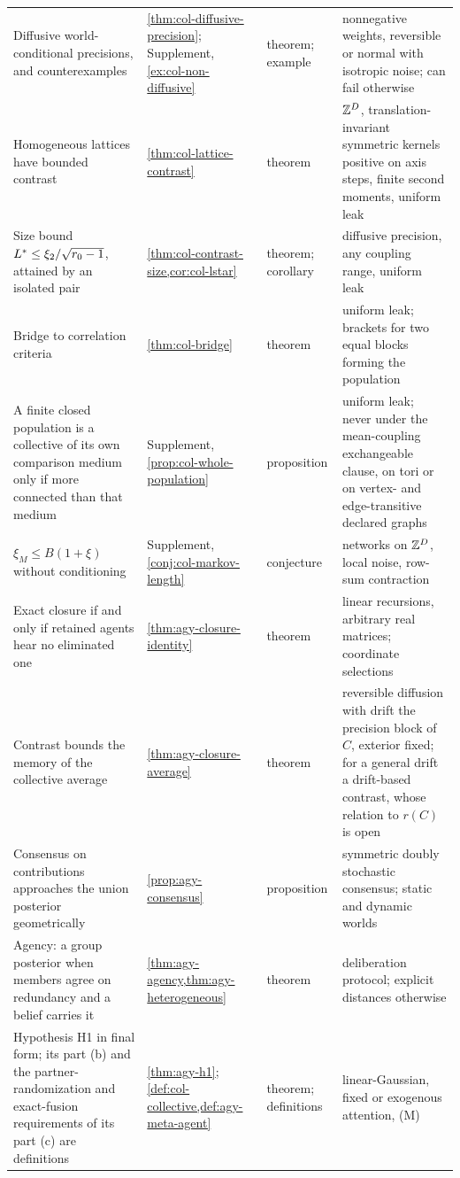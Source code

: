 \begin{longtable}{@{}>{\raggedright\arraybackslash}p{}>{\raggedright\arraybackslash}p{}>{\raggedright\arraybackslash}p{}>{\raggedright\arraybackslash}p{}@{}}
Diffusive world-conditional precisions, and counterexamples & \cref{thm:col-diffusive-precision}; Supplement, \cref{ex:col-non-diffusive} & theorem; example & nonnegative weights, reversible or normal with isotropic noise; can fail otherwise\\
Homogeneous lattices have bounded contrast & \cref{thm:col-lattice-contrast} & theorem & $\mathbb{Z}^D$, translation-invariant symmetric kernels positive on axis steps, finite second moments, uniform leak\\
Size bound $L^{\ast}\le\xi_2/\sqrt{r_0-1}$, attained by an isolated pair & \cref{thm:col-contrast-size,cor:col-lstar} & theorem; corollary & diffusive precision, any coupling range, uniform leak\\
Bridge to correlation criteria & \cref{thm:col-bridge} & theorem & uniform leak; brackets for two equal blocks forming the population\\
A finite closed population is a collective of its own comparison medium only if more connected than that medium & Supplement, \cref{prop:col-whole-population} & proposition & uniform leak; never under the mean-coupling exchangeable clause, on tori or on vertex- and edge-transitive declared graphs\\
$\xi_M\le B(1+\xi)$ without conditioning & Supplement, \cref{conj:col-markov-length} & conjecture & networks on $\mathbb{Z}^D$, local noise, row-sum contraction\\
\addlinespace[2pt]
Exact closure if and only if retained agents hear no eliminated one & \cref{thm:agy-closure-identity} & theorem & linear recursions, arbitrary real matrices; coordinate selections\\
Contrast bounds the memory of the collective average & \cref{thm:agy-closure-average} & theorem & reversible diffusion with drift the precision block of $C$, exterior fixed; for a general drift a drift-based contrast, whose relation to $r(C)$ is open\\
Consensus on contributions approaches the union posterior geometrically & \cref{prop:agy-consensus} & proposition & symmetric doubly stochastic consensus; static and dynamic worlds\\
Agency: a group posterior when members agree on redundancy and a belief carries it & \cref{thm:agy-agency,thm:agy-heterogeneous} & theorem & deliberation protocol; explicit distances otherwise\\
Hypothesis H1 in final form; its part (b) and the partner-randomization and exact-fusion requirements of its part (c) are definitions & \cref{thm:agy-h1}; \cref{def:col-collective,def:agy-meta-agent} & theorem; definitions & linear-Gaussian, fixed or exogenous attention, (M)\\
\end{longtable}
\endgroup

